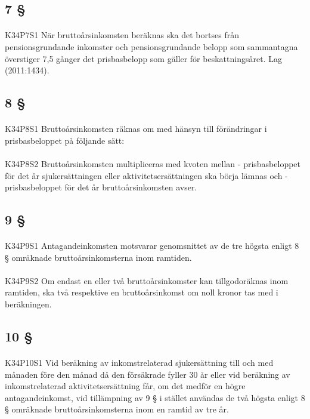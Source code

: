 \documentclass[a4paper,notitlepage,openany,10pt]{book}
\begin{document}
\subsection*{7 §}
\paragraph*{}
{\tiny K34P7S1}
När bruttoårsinkomsten beräknas ska det bortses från pensionsgrundande inkomster och pensionsgrundande belopp som sammantagna överstiger 7,5 gånger det prisbasbelopp som gäller för beskattningsåret.
Lag (2011:1434).
\subsection*{8 §}
\paragraph*{}
{\tiny K34P8S1}
Bruttoårsinkomsten räknas om med hänsyn till förändringar i prisbasbeloppet på följande sätt:
\paragraph*{}
{\tiny K34P8S2}
Bruttoårsinkomsten multipliceras med kvoten mellan
\newline - prisbasbeloppet för det år sjukersättningen eller aktivitetsersättningen ska börja lämnas och
\newline - prisbasbeloppet för det år bruttoårsinkomsten avser.
\subsection*{9 §}
\paragraph*{}
{\tiny K34P9S1}
Antagandeinkomsten motsvarar genomsnittet av de tre högsta enligt 8 § omräknade bruttoårsinkomsterna inom ramtiden.
\paragraph*{}
{\tiny K34P9S2}
Om endast en eller två bruttoårsinkomster kan tillgodoräknas inom ramtiden, ska två respektive en bruttoårsinkomst om noll kronor tas med i beräkningen.
\subsection*{10 §}
\paragraph*{}
{\tiny K34P10S1}
Vid beräkning av inkomstrelaterad sjukersättning till och med månaden före den månad då den försäkrade fyller 30 år eller vid beräkning av inkomstrelaterad aktivitetsersättning får, om det medför en högre antagandeinkomst, vid tillämpning av 9 § i stället användas de två högsta enligt 8 § omräknade bruttoårsinkomsterna inom en ramtid av tre år.
\end{document}
